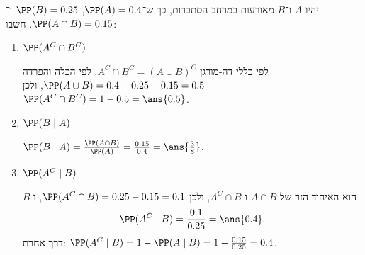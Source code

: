 יהיו $A$ ו־$B$ מאורעות במרחב הסתברות, כך ש־$\PP(A)=0.4$, $\PP(B)=0.25$ ו־$\PP(A\cap B)=0.15$. חשבו:
\begin{enumerate}
\item $\PP(A^C\cap B^C)$
\begin{solbox}
לפי כללי דה-מורגן $A^C\cap B^C=(A\cup B)^C$. לפי הכלה והפרדה $\PP(A\cup B)=0.4+0.25-0.15=0.5$, ולכן
$\PP(A^C\cap B^C)=1-0.5=\ans{0.5}$.
\end{solbox}
\item $\PP(B\mid A)$
\begin{solbox}
$\PP(B\mid A)=\frac{\PP(A\cap B)}{\PP(A)}=\frac{0.15}{0.4}=\ans{\frac38}$.
\end{solbox}
\item $\PP(A^C\mid B)$
\begin{solbox}
$B$ הוא האיחוד הזר של $A\cap B$ ו-$A^C\cap B$, ולכן $\PP(A^C\cap B)=0.25-0.15=0.1$, ו-
\[
\PP(A^C\mid B)=\frac{0.1}{0.25}=\ans{0.4}.
\]
דרך אחרת: $\PP(A^C\mid B)=1-\PP(A\mid B)=1-\frac{0.15}{0.25}=0.4$.
\end{solbox}
\end{enumerate}
